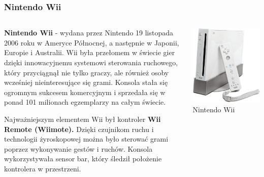 \documentclass[8pt]{beamer}
\begin{document}
\begin{frame}
\frametitle{Nintendo Wii}
\begin{columns}

\begin{column}{0.6\textwidth}
\textbf {Nintendo Wii} - wydana przez Nintendo 19 listopada 2006 roku w Ameryce Północnej, a następnie w Japonii, Europie i Australii. 
Wii była przełomem w świecie gier dzięki innowacyjnemu systemowi sterowania ruchowego, który przyciągnął nie tylko graczy, ale również osoby wcześniej nieinteresujące się grami. Konsola stała się ogromnym sukcesem komercyjnym i sprzedała się w ponad 101 milionach egzemplarzy na całym świecie.

\vspace{0.5em}
Najważniejszym elementem Wii był kontroler \textbf{Wii Remote (Wiimote).} Dzięki czujnikom ruchu i technologii żyroskopowej można było sterować grami poprzez wykonywanie gestów i ruchów. Konsola wykorzystywała sensor bar, który śledził położenie kontrolera w przestrzeni.

\end{column}

\begin{column}{0.35\textwidth}
        \centering
        \includegraphics[width=\textwidth]{wii.jpg} 
        {\small Nintendo Wii} 
    \end{column}
\end{columns}

\end{frame}
\end{document}
